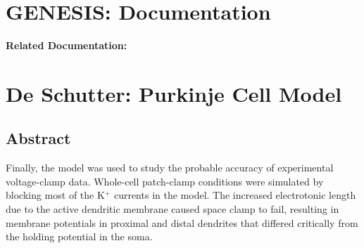 \documentclass[12pt]{article}
\begin{document}
\section*{GENESIS: Documentation}

{\bf Related Documentation:}

\section*{De Schutter: Purkinje Cell Model}

\subsection*{Abstract}

Finally, the model was used to study the probable accuracy
of experimental voltage-clamp data. Whole-cell patch-clamp conditions
were simulated by blocking most of the K$^+$ currents in the
model. The increased electrotonic length due to the active dendritic
membrane caused space clamp to fail, resulting in membrane
potentials in proximal and distal dendrites that differed critically
from the holding potential in the soma.
\end{document}
